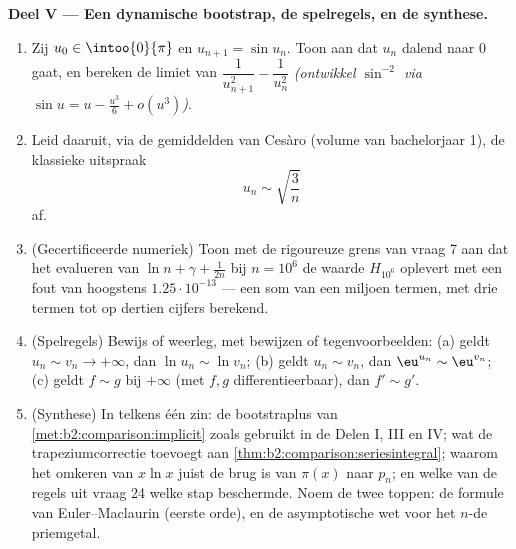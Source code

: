 \begin{problem}
\medskip
\noindent\textbf{Deel V --- Een dynamische bootstrap, de
spelregels, en de synthese.}
\begin{enumerate}[resume]
  \item Zij $u_0 \in \intoo{0}{\pi}$ en $u_{n+1} = \sin u_n$. Toon
        aan dat $u_n$ dalend naar $0$ gaat, en bereken de limiet
        van $\dfrac{1}{u_{n+1}^2} - \dfrac{1}{u_n^2}$
        \emph{(ontwikkel $\sin^{-2}$ via $\sin u = u -
        \frac{u^3}6 + o(u^3)$)}.
  \item Leid daaruit, via de gemiddelden van Cesàro (volume van
        bachelorjaar 1), de klassieke uitspraak
        \[
        u_n \sim \sqrt{\frac{3}{n}}
        \]
        af.
  \item (Gecertificeerde numeriek) Toon met de rigoureuze grens
        van vraag 7 aan dat het evalueren van $\ln n + \gamma +
        \frac1{2n}$ bij $n = 10^6$ de waarde $H_{10^6}$ oplevert
        met een fout van hoogstens $1.25\cdot10^{-13}$ --- een som
        van een miljoen termen, met drie termen tot op dertien
        cijfers berekend.
  \item (Spelregels) Bewijs of weerleg, met bewijzen of
        tegenvoorbeelden: (a) geldt $u_n \sim v_n \to +\infty$,
        dan $\ln u_n \sim \ln v_n$; (b) geldt $u_n \sim v_n$, dan
        $\eu^{u_n} \sim \eu^{v_n}$; (c) geldt $f \sim g$ bij
        $+\infty$ (met $f, g$ differentieerbaar), dan $f' \sim
        g'$.
  \item (Synthese) In telkens één zin: de bootstraplus van
        \cref{met:b2:comparison:implicit} zoals gebruikt in de
        Delen I, III en IV; wat de trapeziumcorrectie toevoegt aan
        \cref{thm:b2:comparison:seriesintegral}; waarom het
        omkeren van $x\ln x$ juist de brug is van $\pi(x)$ naar
        $p_n$; en welke van de regels uit vraag 24 welke stap
        beschermde. Noem de twee toppen: de formule van
        Euler--Maclaurin (eerste orde), en de asymptotische wet
        voor het $n$-de priemgetal.
\end{enumerate}
\end{problem}
